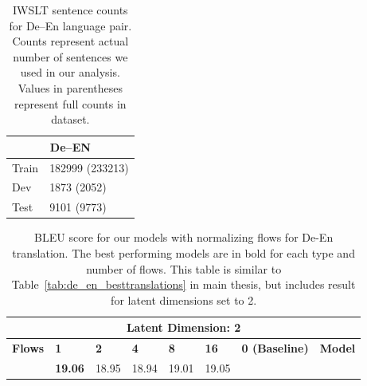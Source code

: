 \begin{table}[]
	\caption{IWSLT sentence counts for De--En language pair. Counts represent actual number of sentences we used in our analysis. Values in parentheses represent full counts in dataset.} 
	\center
	\begin{tabular}{|l|l|}
		\hline
		\multicolumn{2}{|c|}{De--EN} \\ \hline
		Train    & 182999 (233213)   \\ \hline
		Dev      & 1873 (2052)       \\ \hline
		Test     & 9101  (9773)      \\ \hline
	\end{tabular}
\end{table}



\begin{table}[] 
	\caption{BLEU score for our models with normalizing flows for De-En translation. The best performing models are in bold for each type and number of flows. This table is similar to Table~\ref{tab:de_en_besttranslations} in main thesis, but includes result for latent dimensions set to 2. }
	\label{tab:de_en_besttranslations_supp}
	\begin{tabular}{llllllcl}
		\multicolumn{8}{c}{\textbf{Latent Dimension: 2}}                                                                                                                                                                                                                                                                                                                                                                                                                                                                                                   \\ \hline
		\multicolumn{1}{|l|}{\textbf{Flows}}                          & \multicolumn{1}{l|}{\textbf{1}}                             & \multicolumn{1}{l|}{\textbf{2}}                             & \multicolumn{1}{l|}{\textbf{4}}                             & \multicolumn{1}{l|}{\textbf{8}}                             & \multicolumn{1}{l|}{\textbf{16}}                            & \multicolumn{1}{l|}{\textbf{0 (Baseline)}}                                    & \multicolumn{1}{c|}{\textbf{Model}}                                          \\ \hline
		\rowcolor[HTML]{F9F9E1} 
		\multicolumn{1}{|l|}{\cellcolor[HTML]{F9F9E1}Planar}          & \multicolumn{1}{l|}{\cellcolor[HTML]{F9F9E1}\textbf{19.06}} & \multicolumn{1}{l|}{\cellcolor[HTML]{F9F9E1}18.95}          & \multicolumn{1}{l|}{\cellcolor[HTML]{F9F9E1}18.94}          & \multicolumn{1}{l|}{\cellcolor[HTML]{F9F9E1}19.01}          & \multicolumn{1}{l|}{\cellcolor[HTML]{F9F9E1}19.05}          & \multicolumn{1}{c|}{\cellcolor[HTML]{F9F9E1}}                                 & \multicolumn{1}{l|}{\cellcolor[HTML]{F9F9E1}}                                \\ \cline{1-6}

\end{tabular}
\end{table}
